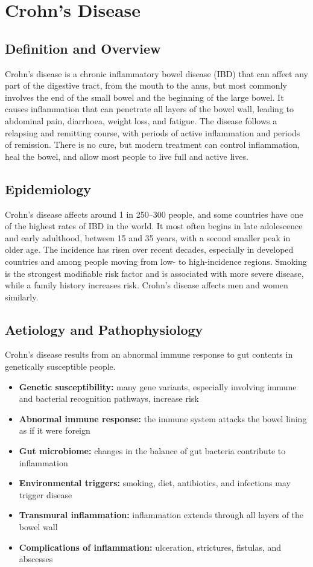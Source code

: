 \chapter{Crohn's Disease}

\section*{Definition and Overview}
Crohn's disease is a chronic inflammatory bowel disease (IBD) that can affect any part of the digestive tract, from the mouth to the anus, but most commonly involves the end of the small bowel and the beginning of the large bowel. It causes inflammation that can penetrate all layers of the bowel wall, leading to abdominal pain, diarrhoea, weight loss, and fatigue. The disease follows a relapsing and remitting course, with periods of active inflammation and periods of remission. There is no cure, but modern treatment can control inflammation, heal the bowel, and allow most people to live full and active lives.

\section*{Epidemiology}
Crohn's disease affects around 1 in 250--300 people, and some countries have one of the highest rates of IBD in the world. It most often begins in late adolescence and early adulthood, between 15 and 35 years, with a second smaller peak in older age. The incidence has risen over recent decades, especially in developed countries and among people moving from low- to high-incidence regions. Smoking is the strongest modifiable risk factor and is associated with more severe disease, while a family history increases risk. Crohn's disease affects men and women similarly.

\section*{Aetiology and Pathophysiology}
Crohn's disease results from an abnormal immune response to gut contents in genetically susceptible people.

\begin{itemize}
    \item \textbf{Genetic susceptibility:} many gene variants, especially involving immune and bacterial recognition pathways, increase risk
    \item \textbf{Abnormal immune response:} the immune system attacks the bowel lining as if it were foreign
    \item \textbf{Gut microbiome:} changes in the balance of gut bacteria contribute to inflammation
    \item \textbf{Environmental triggers:} smoking, diet, antibiotics, and infections may trigger disease
    \item \textbf{Transmural inflammation:} inflammation extends through all layers of the bowel wall
    \item \textbf{Complications of inflammation:} ulceration, strictures, fistulas, and abscesses
\end{itemize}

